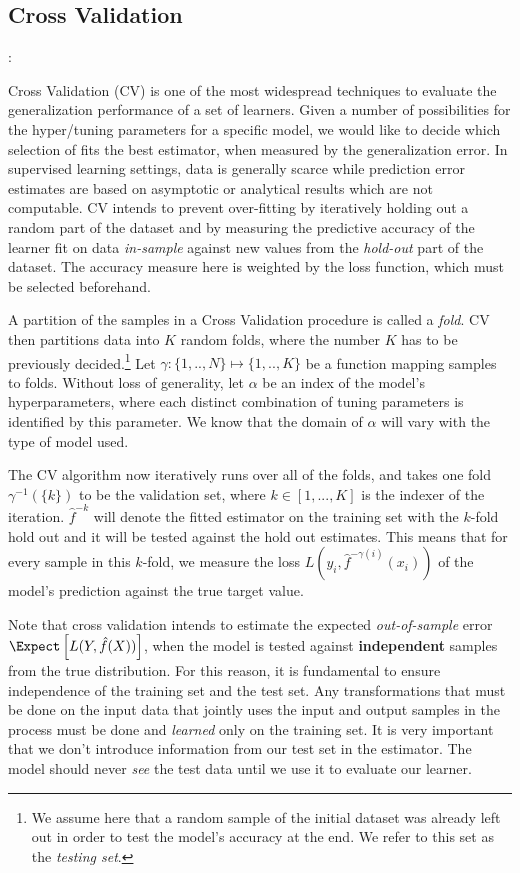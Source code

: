  \subsection{Cross Validation}:  
 
 Cross Validation (CV) is one of the most widespread techniques to evaluate the generalization performance of a set of learners. Given a number of possibilities for the hyper/tuning parameters for a specific model, we would like to decide which selection of fits the best estimator, when measured by the generalization error. In supervised learning settings, data is generally scarce while prediction error estimates are based on asymptotic or analytical results which are not computable. CV intends to prevent over-fitting by iteratively holding out a random part of the dataset and by measuring the predictive accuracy of the learner fit on data \textit{in-sample} against new values from the \textit{hold-out} part of the dataset. The accuracy measure here is weighted by the loss function, which must be selected beforehand. 
 
 A partition of the samples in a Cross Validation procedure is called a \textit{fold}. CV then partitions data into $K$ random folds, where the number $K$ has to be previously decided.\footnote{ We assume here that a random sample of the initial dataset was already left out in order to test the model's accuracy at the end. We refer to this set as the \textit{testing set}.} Let $\gamma : \{1,..,N\} \mapsto \{1, .., K\}$ be a function mapping samples to folds. Without loss of generality,  let $\alpha$ be an index of the model's hyperparameters, where each distinct combination of tuning parameters is identified by this parameter. We know that the domain of $\alpha$ will vary with the type of model used. 
 
 The CV algorithm now iteratively runs over all of the folds, and takes one fold $\gamma^{-1}(\{k\})$ to be the validation set, where $k \in [1,...,K]$ is the indexer of the iteration. $\hat{f}^{-k}$ will denote the fitted estimator on the training set with the $k$-fold hold out and it will be tested against the hold out estimates. This means that for every sample in this $k$-fold, we measure the loss $L(y_i, \hat{f}^{-\gamma(i)}(x_i))$ of the model's prediction against the true target value.
 
 Note that cross validation intends to estimate the expected \textit{out-of-sample} error $\Expect \left[  L(Y, \hat{f}(X)) \right]$, when the model is tested against \textbf{independent} samples from the true distribution. For this reason, it is fundamental to ensure independence of the training set and the test set. Any transformations that must be done on the input data that jointly uses the input and output samples in the process must be done and \textit{learned} only on the training set. It is very important that we don't introduce information from our test set in the estimator. The model should never \textit{see} the test data until we use it to evaluate our learner. 
 
